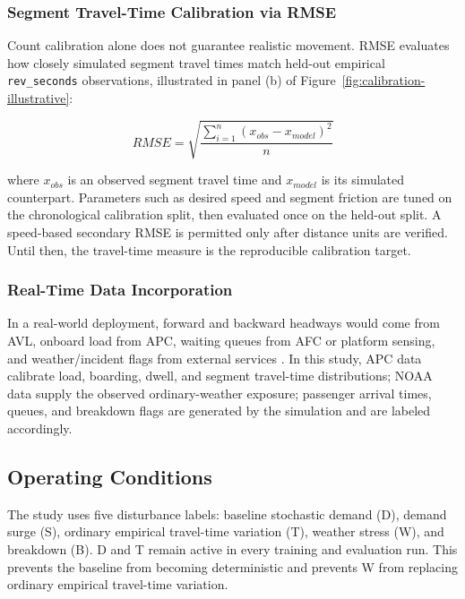 \subsubsection{Segment Travel-Time Calibration via RMSE}

Count calibration alone does not guarantee realistic movement. RMSE evaluates how closely simulated segment travel times match held-out empirical \texttt{rev\_seconds} observations, illustrated in panel (b) of Figure~\ref{fig:calibration-illustrative}:

\begin{equation} RMSE = \sqrt{\frac{\sum_{i=1}^{n}(x_{obs} - x_{model})^2}{n}} \label{eq:rmse} \end{equation}

where $x_{obs}$ is an observed segment travel time and $x_{model}$ is its simulated counterpart. Parameters such as desired speed and segment friction are tuned on the chronological calibration split, then evaluated once on the held-out split. A speed-based secondary RMSE is permitted only after distance units are verified. Until then, the travel-time measure is the reproducible calibration target.

\subsubsection{Real-Time Data Incorporation}

In a real-world deployment, forward and backward headways would come from AVL, onboard load from APC, waiting queues from AFC or platform sensing, and weather/incident flags from external services \cite{Wangsun}. In this study, APC data calibrate load, boarding, dwell, and segment travel-time distributions; NOAA data supply the observed ordinary-weather exposure; passenger arrival times, queues, and breakdown flags are generated by the simulation and are labeled accordingly.

\subsection{Operating Conditions}

The study uses five disturbance labels: baseline stochastic demand (D), demand surge (S), ordinary empirical travel-time variation (T), weather stress (W), and breakdown (B). D and T remain active in every training and evaluation run. This prevents the baseline from becoming deterministic and prevents W from replacing ordinary empirical travel-time variation.

